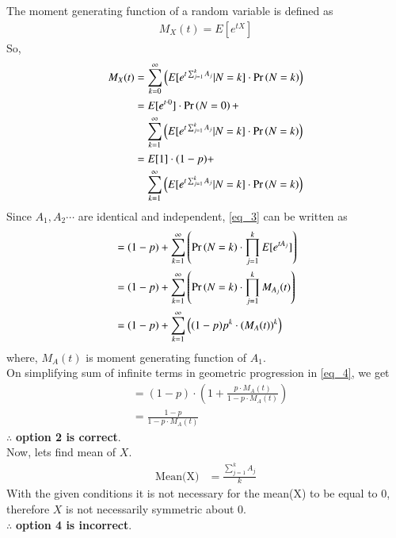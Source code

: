 \documentclass[journal,12pt,twocolumn]{IEEEtran}
\begin{document}
The moment generating function of a random variable is defined as
\begin{align}
    M_X(t)=E[e^{tX}]
\end{align}
So,
\begin{align}
    M_X(t)&=\sum_{k=0}^{\infty}\left(E[e^{t\sum_{j=1}^{k} A_j}
    |N=k]\cdot \pr{N=k}\right)\\
    &\begin{multlined}
    =E[e^{t\cdot 0}]\cdot \pr{N=0}+\\
    \sum_{k=1}^{\infty}\left(E[e^{t\sum_{j=1}^{k} A_j}
    |N=k]\cdot \pr{N=k}\right)
    \end{multlined}\\
    &\begin{multlined}
    =E[1]\cdot (1-p)+\\
    \sum_{k=1}^{\infty}\left(E[e^{t\sum_{j=1}^{k} A_j}|N=k]\cdot \pr{N=k}\right) \label{eq_3}
    \end{multlined}
\end{align}
Since $A_1,A_2\cdots$ are identical and independent, \eqref{eq_3} can be written as
\begin{align}
    &=(1-p)+\sum_{k=1}^{\infty}\left(\Pr\left(N=k\right)\cdot\prod_{j=1}^k E[e^{tA_j}]\right) \\
    &=(1-p)+\sum_{k=1}^{\infty}\left(\Pr\left(N=k\right)\cdot\prod_{j=1}^k M_{A_j}(t)\right) \\
   & =(1-p)+\sum_{k=1}^{\infty}\left((1-p)p^k\cdot(M_{A}(t))^k\right)\;\label{eq_4}
\end{align}
where, $M_{A}(t)$ is moment generating function of $A_1$.\\
On simplifying sum of infinite terms in geometric progression in \eqref{eq_4}, we get
\begin{align}
    &=(1-p)\cdot \left(1+\frac{p\cdot M_A(t)}{1-p\cdot M_A(t)}\right)\\
    &=\frac{1-p}{1-p\cdot M_A(t) }
\end{align}
$\therefore$ \textbf{option 2 is correct}.\\

Now, lets find mean of $X$.
\begin{align}
    \text{Mean(X)}&=\frac{\sum_{j=1}^{k} A_j}{k}
\end{align}
With the given conditions it is not necessary for the mean(X) to be equal to 0, therefore $X$ is not necessarily symmetric about 0.\\
$\therefore$ \textbf{option 4 is incorrect}.
\end{document}
